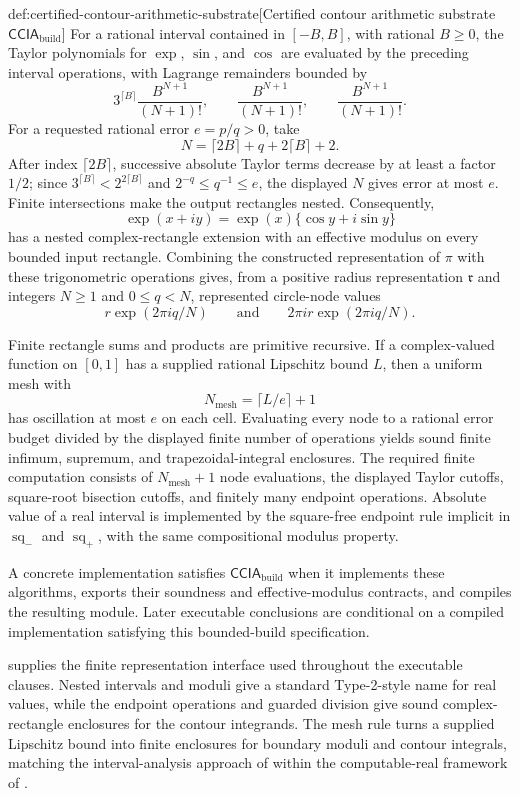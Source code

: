 \begin{definitionv}{def:certified-contour-arithmetic-substrate}[Certified contour arithmetic substrate \(\mathsf{CCIA}_{\mathrm{build}}\)]
For a rational interval contained in \([-B,B]\), with rational \(B\ge0\), the Taylor polynomials for \(\exp\), \(\sin\), and \(\cos\) are evaluated by the preceding interval operations, with Lagrange remainders bounded by
\[
3^{\lceil B\rceil}\frac{B^{N+1}}{(N+1)!},
\qquad
\frac{B^{N+1}}{(N+1)!},
\qquad
\frac{B^{N+1}}{(N+1)!}.
\]
For a requested rational error \(e=p/q>0\), take
\[
N=\lceil2B\rceil+q+2\lceil B\rceil+2.
\]
After index \(\lceil2B\rceil\), successive absolute Taylor terms decrease by at least a factor \(1/2\); since \(3^{\lceil B\rceil}<2^{2\lceil B\rceil}\) and \(2^{-q}\le q^{-1}\le e\), the displayed \(N\) gives error at most \(e\). Finite intersections make the output rectangles nested. Consequently,
\[
\exp(x+iy)=\exp(x)\{\cos y+i\sin y\}
\]
has a nested complex-rectangle extension with an effective modulus on every bounded input rectangle. Combining the constructed representation of \(\pi\) with these trigonometric operations gives, from a positive radius representation \(\mathfrak r\) and integers \(N\ge1\) and \(0\le q<N\), represented circle-node values
\[
r\exp(2\pi iq/N)
\qquad\text{and}\qquad
2\pi i r\exp(2\pi iq/N).
\]

Finite rectangle sums and products are primitive recursive. If a complex-valued function on \([0,1]\) has a supplied rational Lipschitz bound \(L\), then a uniform mesh with
\[
N_{\mathrm{mesh}}=\lceil L/e\rceil+1
\]
has oscillation at most \(e\) on each cell. Evaluating every node to a rational error budget divided by the displayed finite number of operations yields sound finite infimum, supremum, and trapezoidal-integral enclosures. The required finite computation consists of \(N_{\mathrm{mesh}}+1\) node evaluations, the displayed Taylor cutoffs, square-root bisection cutoffs, and finitely many endpoint operations. Absolute value of a real interval is implemented by the square-free endpoint rule implicit in \(\operatorname{sq}_{-}\) and \(\operatorname{sq}_{+}\), with the same compositional modulus property.

A concrete implementation satisfies \(\mathsf{CCIA}_{\mathrm{build}}\) when it implements these algorithms, exports their soundness and effective-modulus contracts, and compiles the resulting module. Later executable conclusions are conditional on a compiled implementation satisfying this bounded-build specification.
\end{definitionv}

 supplies the finite representation interface used throughout the executable clauses. Nested intervals and moduli give a standard Type-2-style name for real values, while the endpoint operations and guarded division give sound complex-rectangle enclosures for the contour integrands. The mesh rule turns a supplied Lipschitz bound into finite enclosures for boundary moduli and contour integrals, matching the interval-analysis approach of \citet{Moore1966} within the computable-real framework of \citet{Weihrauch2000,Ko1991}.

